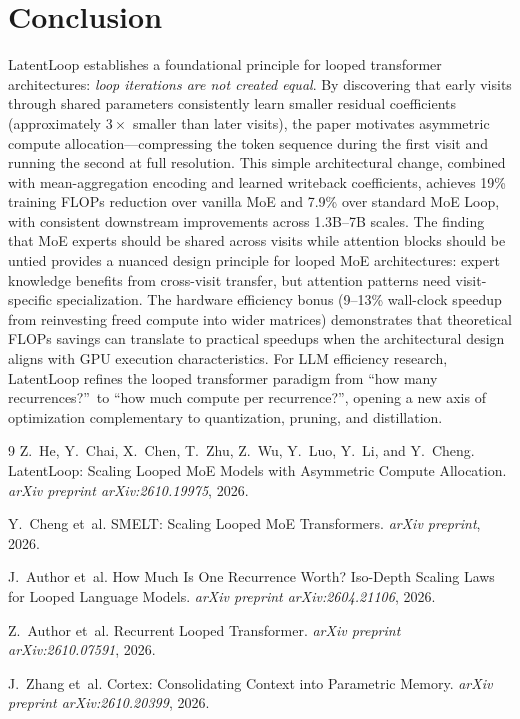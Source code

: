 \documentclass[11pt,a4paper]{article}
\begin{document}
\section{Conclusion}
LatentLoop establishes a foundational principle for looped transformer architectures: \emph{loop iterations are not created equal}. By discovering that early visits through shared parameters consistently learn smaller residual coefficients (approximately $3\times$ smaller than later visits), the paper motivates asymmetric compute allocation---compressing the token sequence during the first visit and running the second at full resolution. This simple architectural change, combined with mean-aggregation encoding and learned writeback coefficients, achieves 19\% training FLOPs reduction over vanilla MoE and 7.9\% over standard MoE Loop, with consistent downstream improvements across 1.3B--7B scales. The finding that MoE experts should be shared across visits while attention blocks should be untied provides a nuanced design principle for looped MoE architectures: expert knowledge benefits from cross-visit transfer, but attention patterns need visit-specific specialization. The hardware efficiency bonus (9--13\% wall-clock speedup from reinvesting freed compute into wider matrices) demonstrates that theoretical FLOPs savings can translate to practical speedups when the architectural design aligns with GPU execution characteristics. For LLM efficiency research, LatentLoop refines the looped transformer paradigm from ``how many recurrences?''\ to ``how much compute per recurrence?'', opening a new axis of optimization complementary to quantization, pruning, and distillation.

\begin{thebibliography}{9}
Z.~He, Y.~Chai, X.~Chen, T.~Zhu, Z.~Wu, Y.~Luo, Y.~Li, and Y.~Cheng.
\newblock LatentLoop: Scaling Looped MoE Models with Asymmetric Compute Allocation.
\newblock \emph{arXiv preprint arXiv:2610.19975}, 2026.

Y.~Cheng et~al.
\newblock SMELT: Scaling Looped MoE Transformers.
\newblock \emph{arXiv preprint}, 2026.

J.~Author et~al.
\newblock How Much Is One Recurrence Worth? Iso-Depth Scaling Laws for Looped Language Models.
\newblock \emph{arXiv preprint arXiv:2604.21106}, 2026.

Z.~Author et~al.
\newblock Recurrent Looped Transformer.
\newblock \emph{arXiv preprint arXiv:2610.07591}, 2026.

J.~Zhang et~al.
\newblock Cortex: Consolidating Context into Parametric Memory.
\newblock \emph{arXiv preprint arXiv:2610.20399}, 2026.
\end{thebibliography}
\end{document}
